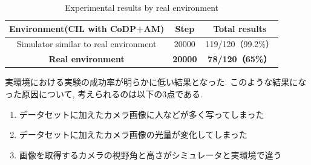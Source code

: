 
\vspace{-0.7cm}

\begin{table}[hbtp]
  \caption{Experimental results by real environment}
  \label{table:real}
  \centering
  \begin{tabular}{|c|c|c|}
    \hline
      Environment(CIL with CoDP+AM)
     & Step & Total results\\
    \hline
    Simulator similar to real environment & 20000 & 119/120（99.2\%）\\
    \hline
    \textbf{Real environment}
    & \textbf{20000} & \textbf{78/120（65\%）}\\
    \hline
  \end{tabular}
\end{table}

実環境における実験の成功率が明らかに低い結果となった. このような結果になった原因について, 考えられるのは以下の3点である.


\begin{enumerate}
  \item データセットに加えたカメラ画像に人などが多く写ってしまった
  \item データセットに加えたカメラ画像の光量が変化してしまった
  \item 画像を取得するカメラの視野角と高さがシミュレータと実環境で違う
\end{enumerate}

